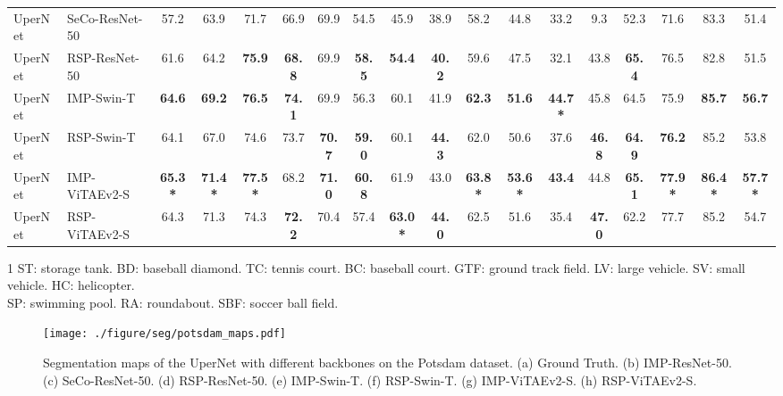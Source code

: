 \documentclass[10pt, journal,twoside]{IEEEtran}
\begin{document}
\begin{table*}[t]
\begin{threeparttable}
{\begin{tabular}{l|l|c|c|c|c|c|c|c|c|c|c|c|c|c|c|c|c}
  UperNet & SeCo-ResNet-50 & 57.2 & 63.9 & 71.7 & 66.9 &69.9  &54.5 & 45.9 &38.9 & 58.2 & 44.8 & 33.2 & 9.3 & 52.3 & 71.6 &83.3 & 51.4 \\
  UperNet & RSP-ResNet-50 & 61.6  & 64.2 & \bfseries 75.9 & \bfseries 68.8 & 69.9 & \bfseries 58.5 & \bfseries 54.4 & \bfseries 40.2 & 59.6 & 47.5 & 32.1 & 43.8 & \bfseries 65.4& 76.5& 82.8 & 51.5 \\
  \hline
  UperNet & IMP-Swin-T & \bfseries 64.6 & \bfseries 69.2 & \bfseries 76.5 & \bfseries 74.1 & 69.9 & 56.3 & 60.1 & 41.9 &\bfseries 62.3& \bfseries 51.6  & \bfseries 44.7\textbf{*} & 45.8 & 64.5 &  75.9 & \bfseries 85.7 & \bfseries 56.7 \\
  UperNet & RSP-Swin-T & 64.1 & 67.0 & 74.6 & 73.7 & \bfseries 70.7 & \bfseries 59.0 & 60.1 & \bfseries 44.3 & 62.0 & 50.6 & 37.6 & \bfseries 46.8 & \bfseries 64.9 & \bfseries 76.2 & 85.2 & 53.8 \\
  \hline
  UperNet & IMP-ViTAEv2-S &\bfseries 65.3\textbf{*} & \bfseries 71.4\textbf{*} & \bfseries 77.5\textbf{*} & 68.2 & \bfseries 71.0 & \bfseries 60.8 & 61.9 & 43.0 & \bfseries 63.8\textbf{*} & \bfseries 53.6\textbf{*} & \bfseries 43.4 & 44.8 & \bfseries 65.1 & \bfseries 77.9\textbf{*} & \bfseries 86.4\textbf{*} & \bfseries 57.7\textbf{*}\\
  UperNet & RSP-ViTAEv2-S & 64.3 & 71.3 & 74.3 & \bfseries 72.2 & 70.4 & 57.4 & \bfseries 63.0\textbf{*} & \bfseries 44.0 & 62.5 & 51.6 & 35.4 & \bfseries 47.0 & 62.2 & 77.7 & 85.2 & 54.7\\
  \hline
\end{tabular}
  }
  \begin{tablenotes}
    \scriptsize
    \item[1] ST: storage tank. BD: baseball diamond. TC: tennis court. BC: baseball court. GTF: ground track field. LV: large vehicle. SV: small vehicle. HC: helicopter.\\ SP: swimming pool. RA: roundabout. SBF: soccer ball field.
  \end{tablenotes}
  \end{threeparttable}
  \label{seg_isaid}
\end{table*}

\begin{figure*}[t]
  \centering
  \texttt{[image: ./figure/seg/potsdam\_maps.pdf]}

  \caption{Segmentation maps of the UperNet with different backbones on the Potsdam dataset. (a) Ground Truth. (b) IMP-ResNet-50. (c) SeCo-ResNet-50. (d) RSP-ResNet-50. (e) IMP-Swin-T. (f) RSP-Swin-T. (g) IMP-ViTAEv2-S. (h) RSP-ViTAEv2-S.}
  \label{seg_potsdam_maps}
\end{figure*}
\end{document}
